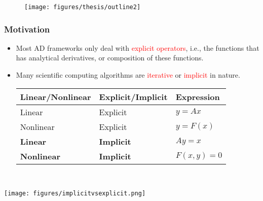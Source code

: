 \documentclass[usenames,dvipsnames]{beamer}
\begin{document}
\begin{frame}	
	
	\begin{figure}[hbt]
		\centering
		\texttt{[image: figures/thesis/outline2]}
	\end{figure}
\end{frame}

\begin{frame}
	
	
	\frametitle{Motivation}
	
	
	\begin{minipage}{0.695\textwidth}
		\vspace{-6cm}
		\begin{itemize}
			\item Most AD frameworks only deal with \textcolor{red}{explicit operators}, i.e., the functions that has analytical derivatives, or composition of these functions. 
			\item Many scientific computing algorithms are \textcolor{red}{iterative} or \textcolor{red}{implicit} in nature.
			\vspace{1cm}
			{\small
			\begin{table}[]
				\begin{tabular}{@{}lll@{}}
					\toprule
					Linear/Nonlinear & Explicit/Implicit & Expression   \\ \midrule
					Linear           & Explicit          & $y=Ax$       \\
					Nonlinear        & Explicit          & $y = F(x)$   \\
					\textbf{Linear}           & \textbf{Implicit}          & $Ay = x$     \\
					\textbf{Nonlinear}        & \textbf{Implicit}          & $F(x,y) = 0$ \\ \bottomrule
				\end{tabular}
			\end{table}
		}
		\end{itemize}
	\end{minipage}~
	\begin{minipage}[t]{0.3\textwidth}
		\texttt{[image: figures/implicitvsexplicit.png]}
	\end{minipage}
	
	
\end{frame}
\end{document}
